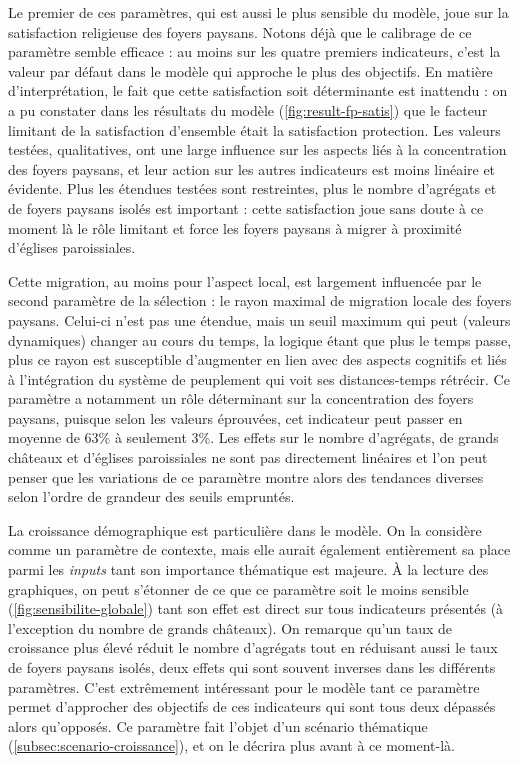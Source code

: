 Le premier de ces paramètres, qui est aussi le plus sensible du modèle, joue sur la satisfaction religieuse des foyers paysans.
Notons déjà que le calibrage de ce paramètre semble efficace : au moins sur les quatre premiers indicateurs, c'est la valeur par défaut dans le modèle qui approche le plus des objectifs.
En matière d'interprétation, le fait que cette satisfaction soit déterminante est inattendu : on a pu constater dans les résultats du modèle (\cref{fig:result-fp-satis}) que le facteur limitant de la satisfaction d'ensemble était la satisfaction protection.
Les valeurs testées, qualitatives, ont une large influence sur les aspects liés à la concentration des foyers paysans, et leur action sur les autres indicateurs est moins linéaire et évidente.
Plus les étendues testées sont restreintes, plus le nombre d'agrégats et de foyers paysans isolés est important : cette satisfaction joue sans doute à ce moment là le rôle limitant et \og force\fg{} les foyers paysans à migrer à proximité d'églises paroissiales.

Cette migration, au moins pour l'aspect local, est largement influencée par le second paramètre de la sélection : le rayon maximal de migration locale des foyers paysans. 
Celui-ci n'est pas une étendue, mais un seuil maximum qui peut (valeurs \og dynamiques\fg{}) changer au cours du temps, la logique étant que plus le temps passe, plus ce rayon est susceptible d'augmenter en lien avec des aspects cognitifs et liés à l'intégration du système de peuplement qui voit ses distances-temps rétrécir.
Ce paramètre a notamment un rôle déterminant sur la concentration des foyers paysans, puisque selon les valeurs éprouvées, cet indicateur peut passer en moyenne de 63\% à seulement 3\%.
Les effets sur le nombre d'agrégats, de grands châteaux et d'églises paroissiales ne sont pas directement linéaires et l'on peut penser que les variations de ce paramètre montre alors des tendances diverses selon l'ordre de grandeur des seuils empruntés.

La croissance démographique est particulière dans le modèle.
On la considère comme un paramètre de contexte, mais elle aurait également entièrement sa place parmi les \textit{inputs} tant son importance thématique est majeure.
À la lecture des graphiques, on peut s'étonner de ce que ce paramètre soit le moins sensible (\cref{fig:sensibilite-globale}) tant son effet est direct sur tous indicateurs présentés (à l'exception du nombre de grands châteaux).
On remarque qu'un taux de croissance plus élevé réduit le nombre d'agrégats tout en réduisant aussi le taux de foyers paysans isolés, deux effets qui sont souvent inverses dans les différents paramètres.
C'est extrêmement intéressant pour le modèle tant ce paramètre permet d'approcher des objectifs de ces indicateurs qui sont tous deux dépassés alors qu'opposés.
Ce paramètre fait l'objet d'un scénario thématique (\cref{subsec:scenario-croissance}), et on le décrira plus avant à ce moment-là.


